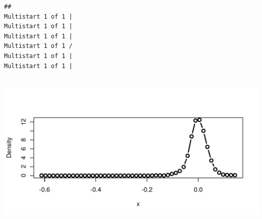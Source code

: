 \begin{knitrout}
\color{fgcolor}\begin{kframe}
\begin{alltt}
 \hlkwb{<-} \hlstd{(}
  
  \hlstd{=} \hlstd{,}
  \hlstd{=} \hlstd{,}
  \hlstd{=} 
\hlstd{)}
\end{alltt}
\begin{verbatim}
## 
Multistart 1 of 1 |
Multistart 1 of 1 |
Multistart 1 of 1 |
Multistart 1 of 1 /
Multistart 1 of 1 |
Multistart 1 of 1 |
                   
\end{verbatim}
\begin{alltt}
 \hlkwb{<-} 

  \hlstd{=} \hlstd{,}  \hlstd{=} \hlstd{)}
\end{alltt}
\end{kframe}
\includegraphics[width=\maxwidth]{figure/unnamed-chunk-28-1} 

\end{knitrout}
